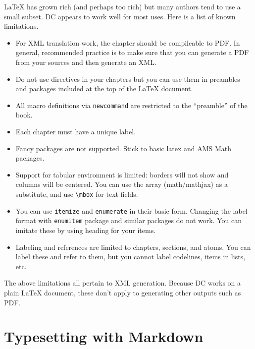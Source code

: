 LaTeX has grown rich (and perhaps too rich) but many authors tend to use a small subset.  
%
DC appears to work well for most uses. 
%
Here is a list of known limitations.  
\begin{itemize}

\item For XML translation work, the chapter should be compileable to PDF.  In general, recommended practice is to make sure that you can generate a PDF from your sources and then generate an XML.

\item Do not use \lstinline`` directives in your chapters but you can use them in preambles and packages included at the top of the LaTeX document.

\item All macro definitions via \lstinline`newcommand` are restricted to the ``preamble'' of the book.

\item Each chapter must have a unique label.

\item Fancy packages are not supported.  Stick to basic latex and AMS Math packages.

\item Support for tabular environment is limited: borders will not show and columns will be centered.  You can use the array (math/mathjax) as a substitute, and  use \lstinline`\mbox` for text fields.  
 
\item You can use \lstinline`itemize` and \lstinline`enumerate` in their basic form.  Changing the label format with \lstinline`enumitem` package and similar packages do not work.  You can imitate these by using heading for your items.  

\item Labeling and references are limited to chapters, sections, and atoms.  You can label these and refer to them, but you cannot label codelines, items in lists, etc.

\end{itemize}

\begin{remark}
The above limitations all pertain to XML generation.  Because DC works on a plain LaTeX document, these don't apply to generating other outputs such as 
PDF.
\end{remark}  



\section{Typesetting with Markdown}

